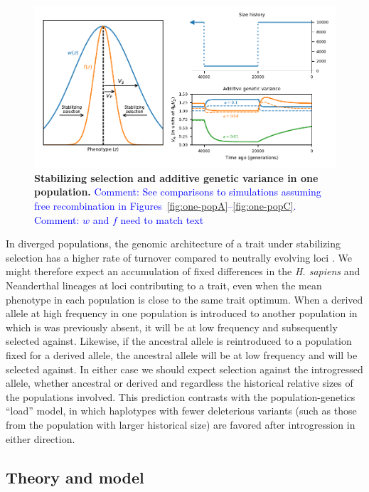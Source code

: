 \documentclass{article}
\newcommand{\aprcomment}[1]{{\textcolor{blue}{Comment: #1}}}
\begin{document}
\begin{figure}[tb!]
    \centering
    \includegraphics{../figures/one_pop.pdf}
    \caption{
        \textbf{Stabilizing selection and additive genetic variance in one population.}
        \aprcomment{See comparisons to simulations assuming free recombination in
        Figures~\ref{fig:one-popA}--\ref{fig:one-popC}.}
        \aprcomment{$w$ and $f$ need to match text}
    }
    \label{fig:one-pop}
\end{figure}

In diverged populations, the genomic architecture of a trait under stabilizing
selection has a higher rate of turnover compared to neutrally evolving loci
\citep{yair2022population}. We might therefore expect an accumulation of fixed
differences in the \emph{H. sapiens} and Neanderthal lineages at loci
contributing to a trait, even when the mean phenotype in each population is
close to the same trait optimum. When a derived allele at high frequency in one
population is introduced to another population in which is was previously
absent, it will be at low frequency and subsequently selected against.
Likewise, if the ancestral allele is reintroduced to a population fixed for a
derived allele, the ancestral allele will be at low frequency and will be
selected against. In either case we should expect selection against the
introgressed allele, whether ancestral or derived and regardless the historical
relative sizes of the populations involved. This prediction contrasts with the
population-genetics ``load'' model, in which haplotypes with fewer deleterious
variants (such as those from the population with larger historical size) are
favored after introgression in either direction.


\subsection*{Theory and model}
\end{document}
